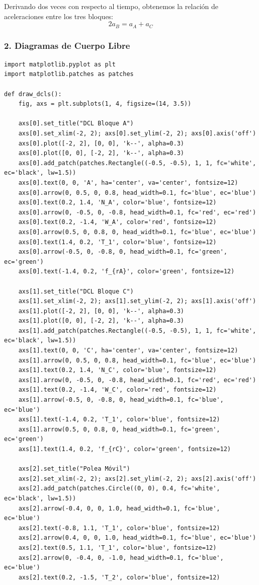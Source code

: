 \documentclass[12pt, a4paper]{article}
\begin{document}
Derivando dos veces con respecto al tiempo, obtenemos la relación de aceleraciones entre los tres bloques:
$$ 2 a_B = a_A + a_C $$

\subsubsection*{2. Diagramas de Cuerpo Libre}

\begin{lstlisting}
import matplotlib.pyplot as plt
import matplotlib.patches as patches

def draw_dcls():
    fig, axs = plt.subplots(1, 4, figsize=(14, 3.5))
    
    axs[0].set_title("DCL Bloque A")
    axs[0].set_xlim(-2, 2); axs[0].set_ylim(-2, 2); axs[0].axis('off')
    axs[0].plot([-2, 2], [0, 0], 'k--', alpha=0.3)
    axs[0].plot([0, 0], [-2, 2], 'k--', alpha=0.3)
    axs[0].add_patch(patches.Rectangle((-0.5, -0.5), 1, 1, fc='white', ec='black', lw=1.5))
    axs[0].text(0, 0, 'A', ha='center', va='center', fontsize=12)
    axs[0].arrow(0, 0.5, 0, 0.8, head_width=0.1, fc='blue', ec='blue')
    axs[0].text(0.2, 1.4, 'N_A', color='blue', fontsize=12)
    axs[0].arrow(0, -0.5, 0, -0.8, head_width=0.1, fc='red', ec='red')
    axs[0].text(0.2, -1.4, 'W_A', color='red', fontsize=12)
    axs[0].arrow(0.5, 0, 0.8, 0, head_width=0.1, fc='blue', ec='blue')
    axs[0].text(1.4, 0.2, 'T_1', color='blue', fontsize=12)
    axs[0].arrow(-0.5, 0, -0.8, 0, head_width=0.1, fc='green', ec='green')
    axs[0].text(-1.4, 0.2, 'f_{rA}', color='green', fontsize=12)
    
    axs[1].set_title("DCL Bloque C")
    axs[1].set_xlim(-2, 2); axs[1].set_ylim(-2, 2); axs[1].axis('off')
    axs[1].plot([-2, 2], [0, 0], 'k--', alpha=0.3)
    axs[1].plot([0, 0], [-2, 2], 'k--', alpha=0.3)
    axs[1].add_patch(patches.Rectangle((-0.5, -0.5), 1, 1, fc='white', ec='black', lw=1.5))
    axs[1].text(0, 0, 'C', ha='center', va='center', fontsize=12)
    axs[1].arrow(0, 0.5, 0, 0.8, head_width=0.1, fc='blue', ec='blue')
    axs[1].text(0.2, 1.4, 'N_C', color='blue', fontsize=12)
    axs[1].arrow(0, -0.5, 0, -0.8, head_width=0.1, fc='red', ec='red')
    axs[1].text(0.2, -1.4, 'W_C', color='red', fontsize=12)
    axs[1].arrow(-0.5, 0, -0.8, 0, head_width=0.1, fc='blue', ec='blue')
    axs[1].text(-1.4, 0.2, 'T_1', color='blue', fontsize=12)
    axs[1].arrow(0.5, 0, 0.8, 0, head_width=0.1, fc='green', ec='green')
    axs[1].text(1.4, 0.2, 'f_{rC}', color='green', fontsize=12)
    
    axs[2].set_title("Polea Móvil")
    axs[2].set_xlim(-2, 2); axs[2].set_ylim(-2, 2); axs[2].axis('off')
    axs[2].add_patch(patches.Circle((0, 0), 0.4, fc='white', ec='black', lw=1.5))
    axs[2].arrow(-0.4, 0, 0, 1.0, head_width=0.1, fc='blue', ec='blue')
    axs[2].text(-0.8, 1.1, 'T_1', color='blue', fontsize=12)
    axs[2].arrow(0.4, 0, 0, 1.0, head_width=0.1, fc='blue', ec='blue')
    axs[2].text(0.5, 1.1, 'T_1', color='blue', fontsize=12)
    axs[2].arrow(0, -0.4, 0, -1.0, head_width=0.1, fc='blue', ec='blue')
    axs[2].text(0.2, -1.5, 'T_2', color='blue', fontsize=12)
    

\end{lstlisting}
\end{document}
